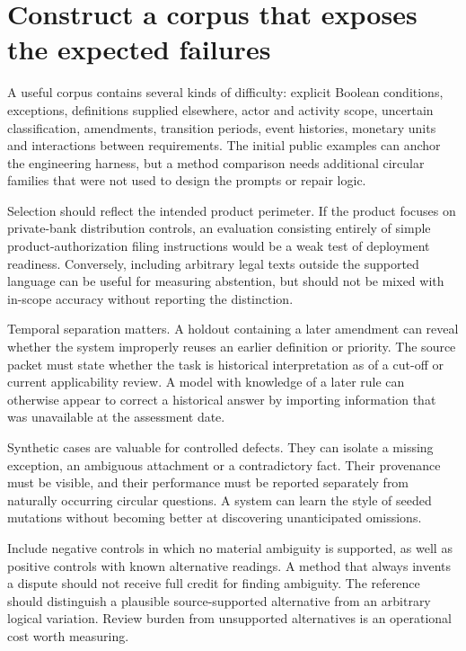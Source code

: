 \documentclass[12pt,a4paper,oneside,openany]{book}
\begin{document}
\section{Construct a corpus that exposes the expected failures}

A useful corpus contains several kinds of difficulty: explicit Boolean conditions,
exceptions, definitions supplied elsewhere, actor and activity scope, uncertain
classification, amendments, transition periods, event histories, monetary units
and interactions between requirements. The initial public examples can anchor the
engineering harness, but a method comparison needs additional circular families
that were not used to design the prompts or repair logic.

Selection should reflect the intended product perimeter. If the product focuses
on private-bank distribution controls, an evaluation consisting entirely of simple
product-authorization filing instructions would be a weak test of deployment
readiness. Conversely, including arbitrary legal texts outside the supported
language can be useful for measuring abstention, but should not be mixed with
in-scope accuracy without reporting the distinction.

Temporal separation matters. A holdout containing a later amendment can reveal
whether the system improperly reuses an earlier definition or priority. The
source packet must state whether the task is historical interpretation as of a
cut-off or current applicability review. A model with knowledge of a later rule
can otherwise appear to correct a historical answer by importing information
that was unavailable at the assessment date.

Synthetic cases are valuable for controlled defects. They can isolate a missing
exception, an ambiguous attachment or a contradictory fact. Their provenance must
be visible, and their performance must be reported separately from naturally
occurring circular questions. A system can learn the style of seeded mutations
without becoming better at discovering unanticipated omissions.

Include negative controls in which no material ambiguity is supported, as well
as positive controls with known alternative readings. A method that always
invents a dispute should not receive full credit for finding ambiguity. The
reference should distinguish a plausible source-supported alternative from an
arbitrary logical variation. Review burden from unsupported alternatives is an
operational cost worth measuring.
\end{document}
